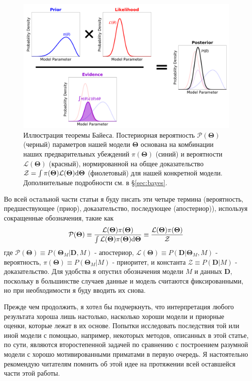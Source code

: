 \documentclass[12pt, titlepage]{article}
\newcommand{\deriv}{\ensuremath{{\rm d}}}  %
\newcommand{\params}{\ensuremath{\boldsymbol\Theta}}
\newcommand{\data}{\ensuremath{\mathbf{D}}}
\newcommand{\likelihood}{\ensuremath{\mathcal{L}}}
\newcommand{\prior}{\ensuremath{\pi}}
\newcommand{\posterior}{\ensuremath{\mathcal{P}}}
\newcommand{\evidence}{\ensuremath{\mathcal{Z}}}
\begin{document}
\begin{figure}
\begin{center}
\includegraphics[width=\textwidth]{figures/fig1.png}
\end{center}
\caption{Иллюстрация теоремы Байеса. Постериорная вероятность $\posterior(\params)$ (черный) параметров нашей модели $\params$ основана на комбинации наших предварительных убеждений $\prior(\params)$ (синий) и вероятности $\likelihood(\params)$ (красный), нормированной на общее доказательство $\evidence = \int \prior(\params) \likelihood(\params) \deriv \params$ (фиолетовый) для нашей конкретной модели. Дополнительные подробности см. в \S\ref{sec:bayes}.}\label{fig:bayes}
\end{figure}

Во всей остальной части статьи я буду писать эти четыре термина (вероятность, предшествующее (приор), доказательство, последующее (апостериор)), используя сокращенные обозначения, такие как
\begin{equation}
    \posterior(\params) 
    \equiv \frac{\likelihood(\params)\prior(\params)}{
    \int \likelihood(\params)\prior(\params) \deriv \params}
    \equiv \frac{\likelihood(\params)\prior(\params)}{\evidence}
\end{equation}
где $\posterior(\params) \equiv P(\params_M | \data, M)$ - апостериор, $\likelihood(\params) \equiv P(\data | \params_M, M)$ - вероятность, $\prior(\params) \equiv P(\params_M | M)$ - приоритет, и константа $\evidence \equiv P(\data | M)$ - доказательство. Для удобства я опустил обозначения модели $M$ и данных $\data$, поскольку в большинстве случаев данные и модель считаются фиксированными, но при необходимости я буду вводить их снова.

Прежде чем продолжить, я хотел бы подчеркнуть, что интерпретация любого результата хороша лишь настолько, насколько хороши модели и приорные оценки, которые лежат в их основе. Попытки исследовать последствия той или иной модели с помощью, например, некоторых методов, описанных в этой статье, по сути, являются второстепенной задачей по сравнению с построением разумной модели с хорошо мотивированными приматами в первую очередь. Я настоятельно рекомендую читателям помнить об этой идее на протяжении всей оставшейся части этой работы.
\end{document}
